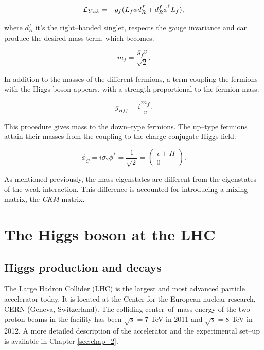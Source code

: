 \begin{equation}
\mathcal{L}_{Yuk}=-g_f(L_f \phi d^f_R + d^f_R \phi^{^\dagger} L_f),
\end{equation}

where $d^f_R$ it's the right--handed singlet, respects the gauge invariance and can produce the desired mass term, which becomes:

\begin{equation}
m_f = \frac{g_f v}{\sqrt{2}}.
\end{equation}

In addition to the masses of the different fermions, a term coupling the fermions with the Higgs boson appears, with a strength proportional to the fermion mass:

\begin{equation}
g_{Hff}=i\frac{m_f}{v}.
\end{equation}

This procedure gives mass to the down--type fermions. 
The up--type fermions attain their masses from the coupling to the charge conjugate Higgs field:

\begin{equation}
\phi_C = i \sigma_2 \phi^{\ast} = \frac{1}{\sqrt{2}}=\begin{pmatrix}
v+H\\ 
0
\end{pmatrix}.
\end{equation}

As mentioned previously, the mass eigenstates are different from the eigenstates of the weak interaction. This difference is accounted for introducing a mixing matrix, the \emph{CKM} matrix. 

\section{The Higgs boson at the LHC}

\subsection{Higgs production and decays}

The Large Hadron Collider (LHC) is the largest and most advanced particle accelerator today. It is located at the Center for the European nuclear research, CERN (Geneva, Switzerland). 
The colliding center--of--mass energy of the two proton beams in the facility has been $\sqrt{s} = 7$ TeV in 2011 and $\sqrt{s} = 8$ TeV in 2012. A more detailed description of the accelerator and the experimental set--up is available in Chapter \ref{sec:chap_2}.

